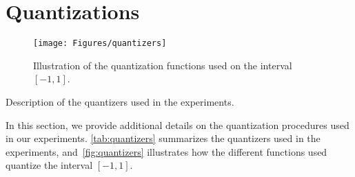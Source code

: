 \section{Quantizations}
\label{app:quantization}

\begin{figure}
    \centering
    \texttt{[image: Figures/quantizers]}
    \caption{Illustration of the quantization functions used on the interval $[-1, 1]$.}
    \label{fig:quantizers}
\end{figure}

\begin{table}
    \centering
    \caption{
        Description of the quantizers used in the experiments.
    }
    \label{tab:quantizers}
    

\end{table}

In this section, we provide additional details on the quantization procedures used in our experiments.
\autoref{tab:quantizers} summarizes the quantizers used in the experiments, and~\autoref{fig:quantizers} illustrates how the different functions used quantize the interval $[-1, 1]$.

\FloatBarrier